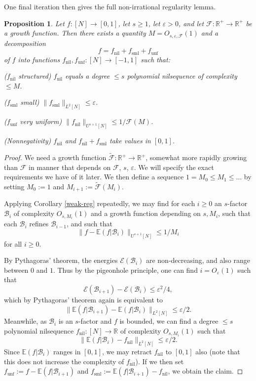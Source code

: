 \documentclass[11pt,reqno]{amsart}
\numberwithin{equation}{section}
\theoremstyle{plain}
\newtheorem{proposition}[subsection]{Proposition}
\theoremstyle{definition}
\renewcommand{\leq}{\leqslant}
\renewcommand{\geq}{\geqslant}
\newcommand\E{{\mathbb{E}}}
\newcommand\R{\mathbb{R}}
\newcommand\B{\mathcal{B}}
\newcommand\1{{\bf 1}}
\newcommand\2{{\bf 2}}
\newcommand\eps{\varepsilon}
\newcommand\nil{{\operatorname{nil}}}
\newcommand\sml{{\operatorname{sml}}}
\newcommand\unf{{\operatorname{unf}}}
\newcommand\Grow{{\mathcal F}}
\begin{document}
One final iteration then gives the full non-irrational regularity lemma.

\begin{proposition}\label{semi-reg}  Let $f: [N] \to [0,1]$, let $s \geq 1$, let $\eps > 0$, and let $\Grow: \R^+ \to \R^+$ be a growth function.  Then there exists a quantity $M = O_{s,\eps,\Grow}(1)$ and a decomposition 
$$ f = f_\nil + f_\sml + f_\unf$$
of $f$ into functions $f_\nil, f_\unf: [N] \to [-1,1]$ such that:

\textup{(}$f_\nil$ structured\textup{)} $f_\nil$ equals a degree $\leq s$ polynomial nilsequence of complexity $\leq M$.

\textup{(}$f_\sml$ small\textup{)} $\| f_\sml \|_{L^2[N]} \leq \eps$.

\textup{(}$f_\unf$ very uniform\textup{)} $\|f_\nil\|_{U^{s+1}[N]} \leq 1/\Grow(M)$.

\textup{(}Nonnegativity\textup{)} $f_\nil$ and $f_\nil + f_\sml$ take values in $[0,1]$.
\end{proposition}
\begin{proof}  We need a growth function $\tilde \Grow: \R^+ \to \R^+$, somewhat more rapidly growing than $\Grow$ in manner that depends on $\Grow$, $s$, $\eps$. We will specify the exact requirements we have of it later.  We then define a sequence $1 = M_0 \leq M_1 \leq \ldots$ by setting $M_0 := 1$ and $M_{i+1} := \tilde \Grow(M_i)$.

Applying Corollary \ref{weak-reg} repeatedly, we may find for each $i \geq 0$ an $s$-factor $\B_i$ of complexity $O_{s,M_i}(1)$ and a growth function depending on $s,M_i$, such that each $\B_i$ refines $\B_{i-1}$, and such that
$$ \| f - \E(f|\B_i) \|_{U^{s+1}[N]} \leq 1/M_i$$
for all $i \geq 0$.

By Pythagoras' theorem, the energies ${\mathcal E}(\B_i)$ are non-decreasing, and also range between $0$ and $1$.  Thus by the pigeonhole principle, one can find $i = O_\eps(1)$ such that
$$ {\mathcal E}(\B_{i+1}) - {\mathcal E}(\B_{i}) \leq \eps^2/4,$$
which by Pythagoras' theorem again is equivalent to
$$ \| \E(f|\B_{i+1}) - \E(f|\B_{i}) \|_{L^2[N]} \leq \eps/2.$$
Meanwhile, as $\B_i$ is an $s$-factor and $f$ is bounded, we can find a degree $\leq s$ polynomial nilsequence $f_\nil: [N] \to \R$ of complexity $O_{s,M_i}(1)$ such that
$$ \| \E(f|\B_{i}) - f_\nil \|_{L^2[N]} \leq \eps/2.$$
Since $\E(f|\B_{i})$ ranges in $[0,1]$, we may retract $f_\nil$ to $[0,1]$ also (note that this does not increase the complexity of $f_\nil$).  If we then set $f_\unf := f -  \E(f|\B_{i+1})$ and $f_\sml :=  \E(f|\B_{i+1}) - f_\nil$, we obtain the claim.
\end{proof}
\end{document}
